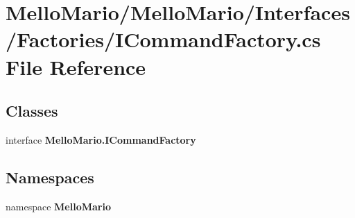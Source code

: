 \section{Mello\+Mario/\+Mello\+Mario/\+Interfaces/\+Factories/\+I\+Command\+Factory.cs File Reference}
\label{ICommandFactory_8cs}
\subsection*{Classes}
\begin{DoxyCompactItemize}
\item 
interface \textbf{ Mello\+Mario.\+I\+Command\+Factory}
\end{DoxyCompactItemize}
\subsection*{Namespaces}
\begin{DoxyCompactItemize}
\item 
namespace \textbf{ Mello\+Mario}
\end{DoxyCompactItemize}
